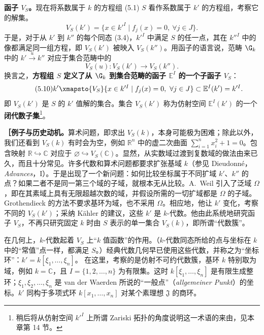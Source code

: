 \textbf{函子 $V_S$。}现在将系数属于 $k$ 的方程组 (5.1) $S$ 看作系数属于 $k'$ 的方程组，考察它的解集。
\begin{equation}\tag{5.8}V_S(k')=\{x\in k'^I\mid f_j(x)=0,\ \forall j\in J\}.
\end{equation}
于是，对于从 $k'$ 到 $k''$ 的每个同态 (3.4)，$k'^I$ 中满足 $S$ 的任一点，其在 $k''^I$ 中的像都满足同一组方程，即 $V_S(k')$ 被映入 $V_S(k'')$。用函子的语言说，范畴 $\G_k$ 中的 $k'\xrightarrow{u}k''$ 对应于集合范畴中的
\begin{equation}\tag{5.9}V_S(u)\colon V_S(k')\longrightarrow V_S(k'').
\end{equation}
换言之，\textbf{方程组 $S$ 定义了从 $\G_k$ 到集合范畴的函子 $\mathbb E^I$ 的一个子函子 $V_S$}：
\begin{equation}\tag{5.10} k'\xmapsto{V_S}\{x\in k'^I\mid f_j(x)=0,\ \forall j\in J\}\subset\mathbb E^I(k')=k'^I.
\end{equation}
即 $V_S(k')$ 是 $S$ 的 $k'$ 值解的集合。集合 $V_S(k')$ 称为仿射空间 $\mathbb E^I(k')$ 的一个\textbf{闭代数子集}\footnote{稍后将从仿射空间 $k'^I$ 上所谓 Zariski 拓扑的角度说明这一术语的来由，见本章第 14 节。}。

\textbf{［例子与历史动机。}算术问题，即求出 $V_S(k)$，本身可能极为困难；除此以外，我们还看到 $V_S(k)$ 有时会为空，例如 $\mathbb R^n$ 中的虚二次曲面 $\sum_{i=1}^n x_i^2+1=0$。包含映射 $\mathbb R\hookrightarrow\mathbb C$ 对应于 $\varnothing\hookrightarrow V_S(\mathbb C)$。显然，从实数域过渡到复数域的做法由来已久，而且十分常见。许多代数和算术问题都要求扩张基域 $k$（参见 Dieudonné，\textit{Advances}，I）。于是出现了一个新问题：如何比较坐标属于不同扩域 $k'$、$k''$ 的点？如果二者不是同一第三个域的子域，就根本无从比较。A.~Weil 引入了泛域 $\Omega$，即在其素域上具有无限超越次数的域，并假设所需的一切扩域都是 $\Omega$ 的子域。Grothendieck 的方法不要求基环为域，也不采用 $\Omega$。相应地，他让 $k'$ 变化，考察不同的 $V_S(k')$；采纳 Kähler 的建议，这些 $k'$ 是 $k$-代数。他由此系统地研究函子 $V_S$，不再只研究固定 $k$ 时由 $S$ 表示的单一集合 $V_S(k)$，即所谓“代数簇”。

在几何上，$k$-代数起着 $V_S$ 上“$k$ 值函数”的作用。（$k$-代数同态所给的点与坐标在 $k$ 中的“常值”点一样，都满足 $S$。）经典代数几何早已使用这些代数，并称之为“坐标环”：$k'=k[\xi_1,\ldots,\xi_n]$。
在这里，考察的是仿射不可约代数簇，基环 $k$ 特别取为域，例如 $k=\mathbb C$，且 $I=\{1,2,\ldots,n\}$ 为有限集。这时 $k[\xi_1,\ldots,\xi_n]$ 是有限生成整环；$\xi_1,\xi_2,\ldots,\xi_n$ 是 van der Waerden 所说的“一般点”（\textit{allgemeiner Punkt}）的坐标。$k'$ 同构于多项式环 $k[x_1,\ldots,x_n]$ 对某个素理想 $\mathfrak J$ 的商环。

